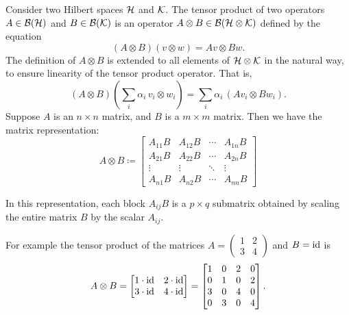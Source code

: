 \begin{definition}
  Consider two Hilbert spaces $\mathcal{H}$ and $\mathcal{K}$. 
  The tensor product of two operators $A \in \mathcal{B}(\mathcal{H}) $ and $B \in   \mathcal{B}(\mathcal{K})$ is an operator $A \otimes B \in  \mathcal{B}(\mathcal{H} \otimes \mathcal{K}) $ defined by the equation
\begin{equation*}
  (A \otimes B)(v \otimes w) = Av \otimes Bw.
\end{equation*}
The definition of $A \otimes B$ is extended to all elements of $\mathcal{H} \otimes \mathcal{K}$ in the natural way, to ensure linearity of the tensor product operator. That is,
\begin{equation*} \label{eq:linear_tensor_operator}
(A \otimes B) \left( \sum_i \alpha_i\, v_i \otimes w_i \right)
= \sum_i \alpha_i\, (A v_i \otimes B w_i).
\end{equation*}
Suppose $A$ is an $n \times n$ matrix, and $B$ is a $m \times m$ matrix. Then we have the matrix representation:
\begin{equation*} \label{eq:matrix_tensor_product}
A \otimes B \coloneqq
\begin{bmatrix}
A_{11} B & A_{12} B & \cdots & A_{1n} B \\
A_{21} B & A_{22} B & \cdots & A_{2n} B \\
\vdots   & \vdots   & \ddots & \vdots   \\
A_{n1} B & A_{n2} B & \cdots & A_{nn} B
\end{bmatrix}
\end{equation*}

In this representation, each block $A_{ij} B$ is a $p \times q$ submatrix 
obtained by scaling the entire matrix $B$ by the scalar $A_{ij}$.


For example the tensor product of the matrices $A= \left(\begin{smallmatrix}
    1 & 2 \\
    3 & 4
  \end{smallmatrix}\right) $ and $B=\mathrm{id} $ is
\begin{equation} \label{eq:pauli_tensor}
A \otimes B =
\begin{bmatrix}
1 \cdot \mathrm{id} & 2 \cdot \mathrm{id} \\
3 \cdot \mathrm{id} & 4 \cdot \mathrm{id}
\end{bmatrix}
=
\begin{bmatrix}
1 & 0 & 2 & 0 \\
0 & 1 & 0 & 2 \\
3 & 0 & 4 & 0 \\
0 & 3 & 0 & 4
\end{bmatrix}.
\end{equation}

\end{definition}


